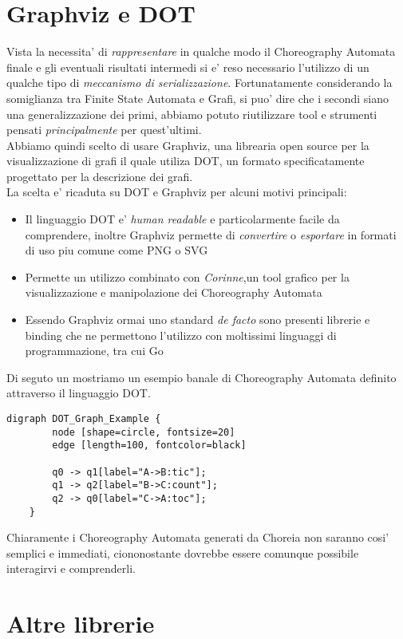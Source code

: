\section{Graphviz e DOT}
Vista la necessita' di \emph{rappresentare} in qualche modo il Choreography Automata finale e gli eventuali risultati intermedi si e' reso necessario l'utilizzo di un qualche tipo di \emph{meccanismo di serializzazione}. Fortunatamente considerando la somiglianza tra Finite State Automata e Grafi, si puo' dire che i secondi siano una generalizzazione dei primi, abbiamo potuto riutilizzare tool e strumenti pensati \emph{principalmente} per quest'ultimi.\\
Abbiamo quindi scelto di usare Graphviz\cite{Graphviz_Wikipedia}, una librearia open source per la visualizzazione di grafi il quale utiliza DOT\cite{DOT_Wikipedia}, un formato specificatamente progettato per la descrizione dei grafi.\\
La scelta e' ricaduta su DOT e Graphviz per alcuni motivi principali:
\begin{itemize}
    \item Il linguaggio DOT e' \emph{human readable} e particolarmente facile da comprendere, inoltre Graphviz permette di \emph{convertire} o \emph{esportare} in formati di uso piu comune come PNG o SVG
    \item Permette un utilizzo combinato con \emph{Corinne}\cite{Corinne},un tool grafico per la visualizzazione e manipolazione dei Choreography Automata
    \item Essendo Graphviz ormai uno standard \emph{de facto} sono presenti librerie e binding che ne permettono l'utilizzo con moltissimi linguaggi di programmazione, tra cui Go
\end{itemize}
Di seguto un mostriamo un esempio banale di Choreography Automata definito attraverso il linguaggio DOT.
\begin{lstlisting}[caption=Rappresentazione in DOT dell'automa in figura \ref{fig:ChoreographyAutomata_Example}]
    digraph DOT_Graph_Example {
        node [shape=circle, fontsize=20]
        edge [length=100, fontcolor=black]
      
        q0 -> q1[label="A->B:tic"];
        q1 -> q2[label="B->C:count"];
        q2 -> q0[label="C->A:toc"];
    }
\end{lstlisting}
Chiaramente i Choreography Automata generati da Choreia non saranno cosi' semplici e immediati, ciononostante dovrebbe essere comunque possibile interagirvi e comprenderli.

\section{Altre librerie} %